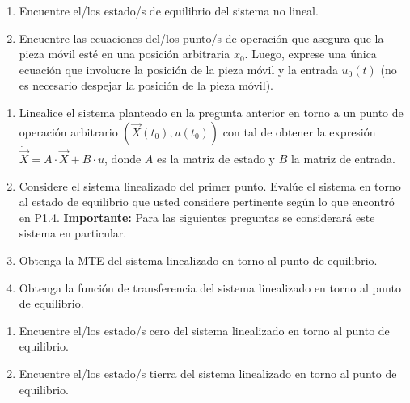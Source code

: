\documentclass[
  11pt,
  letterpaper,
   addpoints,
   answers
  ]{exam}
\begin{document}
\begin{questions}
\begin{enumerate}
  \item Encuentre el/los estado/s de equilibrio del sistema no lineal.

  \item Encuentre las ecuaciones del/los punto/s de operación que asegura que la pieza móvil esté en una posición arbitraria $x_0$. Luego, exprese una única ecuación que involucre la posición de la pieza móvil y la entrada $u_0(t)$ (no es necesario despejar la posición de la pieza móvil).
\end{enumerate}

\vspace{0.5cm}
\noindent{}

\begin{enumerate}
  \item Linealice el sistema planteado en la pregunta anterior en torno a un punto de operación arbitrario $(\vec{X}(t_0), u(t_0))$ con tal de obtener la expresión $\dot{\vec{X}} = A \cdot \vec{X} + B \cdot u$, donde $A$ es la matriz de estado y $B$ la matriz de entrada.

  \item Considere el sistema linealizado del primer punto. Evalúe el sistema en torno al estado de equilibrio que usted considere pertinente según lo que encontró en P1.4. \textbf{Importante:} Para las siguientes preguntas se considerará este sistema en particular.

  \item Obtenga la MTE del sistema linealizado en torno al punto de equilibrio.

  \item Obtenga la función de transferencia del sistema linealizado en torno al punto de equilibrio.
\end{enumerate}

\vspace{0.5cm}
\noindent{}

\begin{enumerate}
  \item Encuentre el/los estado/s cero del sistema linealizado en torno al punto de equilibrio.

  \item Encuentre el/los estado/s tierra del sistema linealizado en torno al punto de equilibrio.
\end{enumerate}

\vspace{0.5cm}
\noindent{}


\end{questions}
\end{document}
